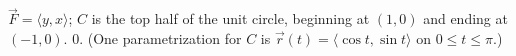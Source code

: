 {$\vec F = \langle y,x\rangle$; $C$ is the top half of the unit circle, beginning at $(1,0)$ and ending at $(-1,0)$.
}
{$0$. (One parametrization for $C$ is $\vec r(t) = \langle \cos t,\sin t\rangle$ on $0\leq t\leq \pi$.)
}
